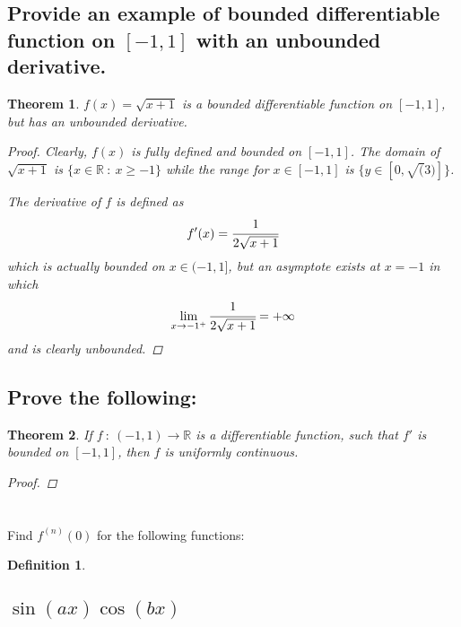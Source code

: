 \documentclass[]{article}
\newcommand{\R}{\mathbb{R}}
\newcommand{\st}{\ : \ }
\newtheorem{definition}{Definition}
\newtheorem{theorem}{Theorem}
\begin{document}
\subsection{
    Provide an example of bounded differentiable function on $[-1,1]$ with an unbounded derivative.
}
\begin{theorem}
    $f(x) = \sqrt{x + 1}$ is a bounded differentiable function on $[-1,1]$, but has an unbounded derivative.
    \begin{proof}
        Clearly, $f(x)$ is fully defined and bounded on $[-1,1]$.
        The domain of $\sqrt{x + 1}$ is $\{x \in \R \st x \geq -1\}$ while the range for $x \in [-1,1]$ is $\{y \in [0,\sqrt(3)]\}$.

        The derivative of $f$ is defined as 
        \[
            f'(x) = \cfrac{1}{2 \sqrt{x + 1}}
        \]
        which is actually bounded on $x \in (-1,1]$, but an asymptote exists at $x = -1$ in which 
        \[
            \lim_{x \to -1^+} \cfrac{1}{2 \sqrt{x + 1}} = + \infty
        \]
        and is clearly unbounded.
    \end{proof}
\end{theorem}

\subsection{Prove the following:}
\begin{theorem}
    If $f \st (-1,1) \to \R$ is a differentiable function, such that $f'$ is bounded on $[-1,1]$, then $f$ is uniformly continuous.
    \begin{proof}
        
    \end{proof}
\end{theorem}










\newpage
\section{}
Find $f^{(n)}(0)$ for the following functions:

\begin{definition}
    
\end{definition}

\subsection{
    $\sin(ax)\cos(bx)$
}
\end{document}
